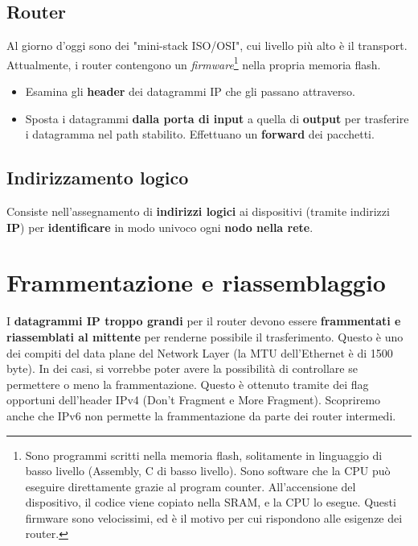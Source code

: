 \subsection{Router}
Al giorno d'oggi sono dei "mini-stack ISO/OSI", cui livello più alto è il transport.\\
Attualmente, i router contengono un \textit{firmware}\footnote{Sono programmi scritti nella memoria flash, solitamente in linguaggio di basso livello (Assembly, C di basso livello). Sono software che la CPU può eseguire direttamente grazie al program counter. All'accensione del dispositivo, il codice viene copiato nella SRAM, e la CPU lo esegue. Questi firmware sono velocissimi, ed è il motivo per cui rispondono alle esigenze dei router.} nella propria memoria flash.
\begin{itemize}
	\item Esamina gli \textbf{header} dei datagrammi IP che gli passano attraverso.
	\item Sposta i datagrammi \textbf{dalla porta di input} a quella di \textbf{output} per trasferire i datagramma nel path stabilito. Effettuano un \textbf{forward} dei pacchetti.
\end{itemize}

\subsection{Indirizzamento logico}
Consiste nell'assegnamento di \textbf{indirizzi logici} ai dispositivi (tramite indirizzi \textbf{IP}) per \textbf{identificare} in modo univoco ogni \textbf{nodo nella rete}.

\section{Frammentazione e riassemblaggio}
I \textbf{datagrammi IP troppo grandi} per il router devono essere \textbf{frammentati e riassemblati al mittente} per renderne possibile il trasferimento. Questo è uno dei compiti del data plane del Network Layer (la MTU dell'Ethernet è di 1500 byte). In dei casi, si vorrebbe poter avere la possibilità di controllare se permettere o meno la frammentazione. Questo è ottenuto tramite dei flag opportuni dell'header IPv4 (Don't Fragment e More Fragment). Scopriremo anche che IPv6 non permette la frammentazione da parte dei router intermedi.


